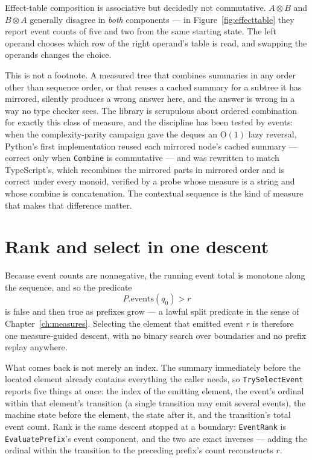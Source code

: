 \documentclass[11pt,twoside,openright]{book}
\newcommand{\code}[1]{\texorpdfstring{\textcolor{d7ink}{\texttt{#1}}}{#1}}
\newcommand{\bigoh}[1]{$\mathrm{O}(#1)$}
\begin{document}
Effect-table composition is associative but decidedly not
commutative. $A \otimes B$ and $B \otimes A$
generally disagree in \emph{both} components --- in Figure~\ref{fig:effecttable}
they report event counts of five and two from the same starting state. The left
operand chooses which row of the right operand's table is read, and swapping the
operands changes the choice.

This is not a footnote. A measured tree that combines summaries in any order
other than sequence order, or that reuses a cached summary for a subtree it has
mirrored, silently produces a wrong answer here, and the answer is wrong in a way
no type checker sees. The library is scrupulous about ordered combination for
exactly this class of measure, and the discipline has been tested by events: when
the complexity-parity campaign gave the deques an \bigoh{1} lazy reversal,
Python's first implementation reused each mirrored node's cached summary ---
correct only when \code{Combine} is commutative --- and was rewritten to match
TypeScript's, which recombines the mirrored parts in mirrored order and is
correct under every monoid, verified by a probe whose measure is a string and
whose combine is concatenation. The contextual sequence is the kind of measure
that makes that difference matter.

\section{Rank and select in one descent}

Because event counts are nonnegative, the running event total is monotone along
the sequence, and so the predicate
\[
  P.\mathrm{events}(q_0) > r
\]
is false and then true as prefixes grow --- a lawful split predicate in the sense
of Chapter~\ref{ch:measures}. Selecting the element that emitted event $r$ is
therefore one measure-guided descent, with no binary search over boundaries and
no prefix replay anywhere.

What comes back is not merely an index. The summary immediately before the
located element already contains everything the caller needs, so
\code{TrySelectEvent} reports five things at once: the index of the emitting
element, the event's ordinal within that element's transition (a single
transition may emit several events), the machine state before the element, the
state after it, and the transition's total event count. Rank is the same descent
stopped at a boundary: \code{EventRank} is \code{EvaluatePrefix}'s event
component, and the two are exact inverses --- adding the ordinal within the
transition to the preceding prefix's count reconstructs $r$.
\end{document}
